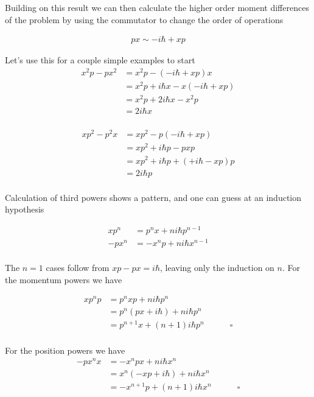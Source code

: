 \documentclass{article}
\begin{document}
Building on this result we can then calculate the higher order moment differences of the problem by using the commutator
to change the order of operations

\begin{align*}
p x \sim -i \hbar + x p
\end{align*}

Let's use this for a couple simple examples to start
\begin{align*}
x^2 p - p x^2
&=
x^2 p - ( -i \hbar + x p) x \\
&=
x^2 p + i \hbar x - x ( -i \hbar + x p) \\
&=
x^2 p + 2 i \hbar x - x^2 p \\
&=
2 i \hbar x \\
\end{align*}

\begin{align*}
x p^2 - p^2 x
&=
x p^2 - p ( -i \hbar + x p) \\
&=
x p^2 + i \hbar p - p x p \\
&=
x p^2 + i \hbar p + ( +i \hbar - x p) p \\
&=
2 i \hbar p \\
\end{align*}

Calculation of third powers shows a pattern, and one can guess at an induction hypothesis

\begin{align*}
x p^n &= p^n x + n i \hbar p^{n-1} \\
-p x^n &= -x^n p + n i \hbar x^{n-1} \\
\end{align*}

The $n=1$ cases follow from $xp - px = i\hbar$, leaving only the induction on $n$.  For the momentum powers we have

\begin{align*}
x p^n p 
&= p^n x p + n i \hbar p^{n} \\
&= p^n (p x + i \hbar) + n i \hbar p^{n} \\
&= p^{n+1} x + (n+1) i \hbar p^{n} \quad\quad\quad\square \\
\end{align*}

For the position powers we have
\begin{align*}
-p x^n x 
&= -x^n p x + n i \hbar x^{n} \\
&= x^n (-x p + i \hbar) + n i \hbar x^{n} \\
&= -x^{n+1} p + (n+1) i \hbar x^{n} \quad\quad\quad\square \\
\end{align*}
\end{document}
